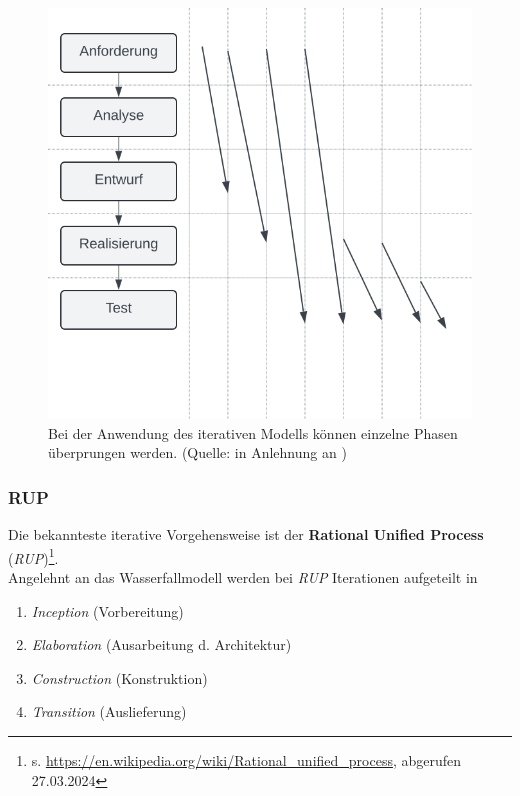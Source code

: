 \begin{figure}
    \centering
    \includegraphics[scale=0.4]{part one/Prozessmodelle/img/iterativ}
    \caption{Bei der Anwendung des iterativen Modells können einzelne Phasen überprungen werden. (Quelle: in Anlehnung an \cite[28, Abb. 3.3]{Wed09})}
    \label{fig:iterativ}
\end{figure}

\subsubsection*{RUP}
Die bekannteste iterative Vorgehensweise ist der \textbf{Rational Unified Process} (\textit{RUP})\footnote{
    s. \url{https://en.wikipedia.org/wiki/Rational_unified_process}, abgerufen 27.03.2024
}.\\
Angelehnt an das Wasserfallmodell werden bei \textit{RUP} Iterationen aufgeteilt in

\begin{enumerate}
    \item \textit{Inception} (Vorbereitung)
    \item \textit{Elaboration} (Ausarbeitung d. Architektur)
    \item \textit{Construction} (Konstruktion)
    \item \textit{Transition} (Auslieferung)
\end{enumerate}

